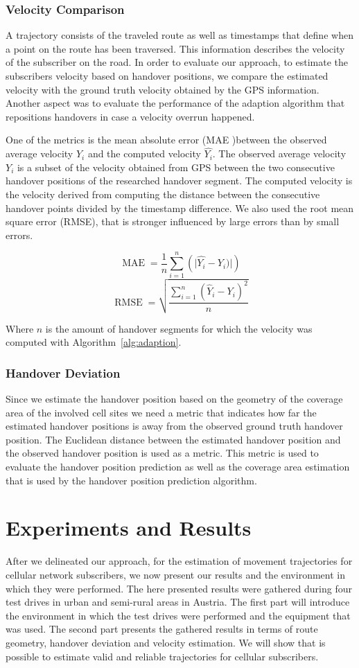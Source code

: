 \documentclass[twocolumn]{bmcart}%
\begin{document}
\subsubsection*{Velocity Comparison}
A trajectory consists of the traveled route as well as timestamps that define when a point on the route has been traversed. This information describes the velocity of the subscriber on the road. In order to evaluate our approach, to estimate the subscribers velocity based on handover positions, we compare the estimated velocity with the ground truth velocity obtained by the GPS information. Another aspect was to evaluate the performance of the adaption algorithm that repositions handovers in case a velocity overrun happened.

One of the metrics is the mean absolute error (MAE )between the observed average velocity $ Y_i$  and the computed velocity $ \hat{Y_i}$. The observed average velocity $Y_i$ is a subset of the velocity obtained from GPS between the two consecutive handover positions of the researched handover segment. The computed velocity is the velocity derived from computing the distance between the consecutive handover points divided by the timestamp difference. We also used the root mean square error (RMSE), that is stronger influenced by large errors than by small errors.

\[\operatorname{MAE}  = \frac{1}{n}\sum_{i=1}^{n} \left(\lvert \hat{Y_i} - Y_i) \rvert \right)\]
\[\operatorname{RMSE}=\sqrt{\frac{\sum_{i=1}^n (\hat Y_i - Y_i)^2}{n}}\]

Where $n$ is the amount of handover segments for which the velocity was computed with Algorithm~\ref{alg:adaption}.
\subsubsection*{Handover Deviation}
Since we estimate the handover position based on the geometry of the coverage area of the involved cell sites we need a metric that indicates how far the estimated handover positions is away from the observed ground truth handover position. The Euclidean distance between the estimated handover position and the observed handover position is used as a metric. This metric is used to evaluate the handover position prediction as well as the coverage area estimation that is used by the handover position prediction algorithm.

\section*{Experiments and Results}
\label{sec:results}
After we delineated our approach, for the estimation of movement trajectories for cellular network subscribers, we now present our results and the environment in which they were performed. The here presented results were gathered during four test drives in urban and semi-rural areas in Austria. The first part will introduce the environment in which the test drives were performed and the equipment that was used. The second part presents the gathered results in terms of route geometry, handover deviation and velocity estimation. We will show that is possible to estimate valid and reliable trajectories for cellular subscribers.
 
\end{document}
